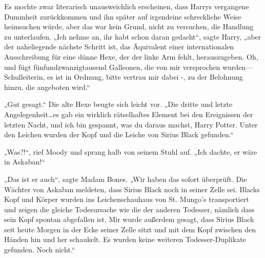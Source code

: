 Es mochte zwar literarisch unausweichlich erscheinen, dass Harrys vergangene Dummheit zurückkommen und ihn später auf irgendeine schreckliche Weise heimsuchen würde, aber das war kein Grund, nicht zu versuchen, die Handlung zu unterlaufen.
„Ich nehme an, ihr habt schon daran gedacht“, sagte Harry, „aber der naheliegende nächste Schritt ist, das Äquivalent einer internationalen Ausschreibung für eine dünne Hexe, der der linke Arm fehlt, herauszugeben. Oh, und fügt fünfundzwanzigtausend Galleonen, die von mir versprochen wurden—Schulleiterin, es ist in Ordnung, bitte vertrau mir dabei -, zu der Belohnung hinzu, die angeboten wird.“

„Gut gesagt.“
Die alte Hexe beugte sich leicht vor.
„Die dritte und letzte Angelegenheit…es gab ein wirklich rätselhaftes Element bei den Ereignissen der letzten Nacht, und ich bin gespannt, was du daraus machst, Harry Potter. Unter den Leichen wurden der Kopf und die Leiche von Sirius Black gefunden.“

„Was?!“, rief Moody und sprang halb von seinem Stuhl auf. „Ich dachte, er wäre in Askaban!“

„Das ist er auch“, sagte Madam Bones. „Wir haben das sofort überprüft. Die Wächter von Askaban meldeten, dass Sirius Black noch in seiner Zelle sei. Blacks Kopf und Körper wurden ins Leichenschauhaus von St. Mungo’s transportiert und zeigen die gleiche Todesursache wie die der anderen Todesser, nämlich dass sein Kopf spontan abgefallen ist. Mir wurde außerdem gesagt, dass Sirius Black seit heute Morgen in der Ecke seiner Zelle sitzt und mit dem Kopf zwischen den Händen hin und her schaukelt. Es wurden keine weiteren Todesser-Duplikate gefunden. Noch nicht.“

